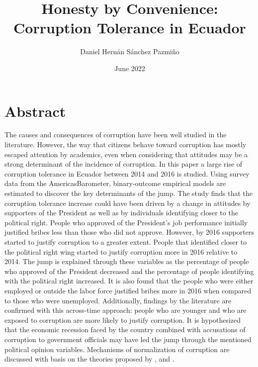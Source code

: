 \documentclass[12pt,a4]{article}\usepackage[]{graphicx}\usepackage[]{xcolor}
\title{Honesty by Convenience: Corruption Tolerance in Ecuador}
\author{Daniel Hernán Sánchez Pazmiño}
\date{June 2022}
\begin{document}
\maketitle
\clearpage





\section*{Abstract}

The causes and consequences of corruption have been well studied in the literature. However, the way that citizens behave toward corruption has mostly escaped attention by academics, even when considering that attitudes may be a strong determinant of the incidence of corruption. In this paper a large rise of corruption tolerance in Ecuador between 2014 and 2016 is studied. Using survey data from the AmericasBarometer, binary-outcome empirical models are estimated to discover the key determinants of the jump. The study finds that the corruption tolerance increase could have been driven by a change in attitudes by supporters of the President as well as by individuals identifying closer to the political right. People who approved of the President's job performance initially justified bribes less than those who did not approve. However, by 2016 supporters started to justify corruption to a greater extent. People that identified closer to the political right wing started to justify corruption more in 2016 relative to 2014. The jump is explained through these variables as the percentage of people who approved of the President decreased and the percentage of people identifying with the political right increased. It is also found that the people who were either employed or outside the labor force justified bribes more in 2016 when compared to those who were unemployed. Additionally, findings by the literature are confirmed with this across-time approach: people who are younger and who are exposed to corruption are more likely to justify corruption. It is hypothesized that the economic recession faced by the country combined with accusations of corruption to government officials may have led the jump through the mentioned political opinion variables. Mechanisms of normalization of corruption are discussed with basis on the theories proposed by \textcite{Ashforth.2003}, \textcite{Hurtado.2007} and \textcite{Adoum.2000}. 
\end{document}
